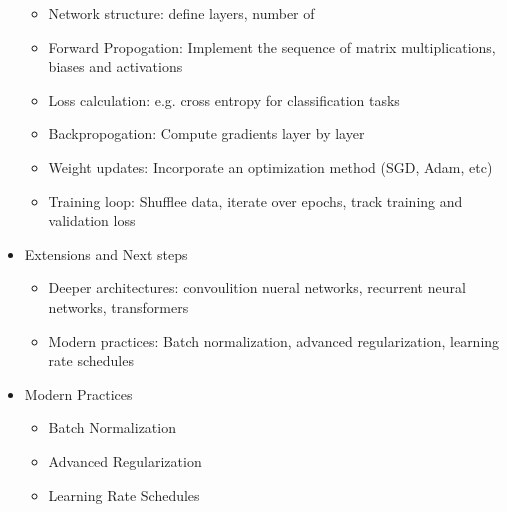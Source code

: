 \documentclass[9pt]{extarticle}
\begin{document}
\begin{itemize}
\begin{itemize}
              \item Network structure: define layers, number of
              \item Forward Propogation: Implement the sequence of matrix multiplications, biases and activations
              \item Loss calculation: e.g. cross entropy for classification tasks
              \item Backpropogation: Compute gradients layer by layer
              \item Weight updates: Incorporate an optimization method (SGD, Adam, etc)
              \item Training loop: Shufflee data, iterate over epochs, track training and validation loss
          \end{itemize}
    \item Extensions and Next steps
          \begin{itemize}
              \item Deeper architectures: convoulition nueral networks, recurrent neural networks, transformers
              \item Modern practices: Batch normalization, advanced regularization, learning rate schedules
          \end{itemize}
    \item Modern Practices
          \begin{itemize}
              \item Batch Normalization
              \item Advanced Regularization
              \item Learning Rate Schedules
          \end{itemize}
\end{itemize}
\end{document}

